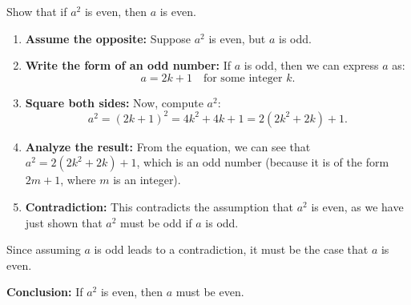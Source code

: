     \begin{example}
            Show that if \( a^2 \) is even, then \( a \) is even.

        \begin{enumerate}
            \item \textbf{Assume the opposite:} 
            Suppose \( a^2 \) is even, but \( a \) is odd.
            
            \item \textbf{Write the form of an odd number:} 
            If \( a \) is odd, then we can express \( a \) as:
            \[
            a = 2k + 1 \quad \text{for some integer } k.
            \]
            
            \item \textbf{Square both sides:} 
            Now, compute \( a^2 \):
            \[
            a^2 = (2k + 1)^2 = 4k^2 + 4k + 1 = 2(2k^2 + 2k) + 1.
            \]
            
            \item \textbf{Analyze the result:} 
            From the equation, we can see that \( a^2 = 2(2k^2 + 2k) + 1 \), which is an odd number (because it is of the form \( 2m + 1 \), where \( m \) is an integer).

            \item \textbf{Contradiction:} 
            This contradicts the assumption that \( a^2 \) is even, as we have just shown that \( a^2 \) must be odd if \( a \) is odd.

        \end{enumerate}

        Since assuming \( a \) is odd leads to a contradiction, it must be the case that \( a \) is even. 

        \textbf{Conclusion:} If \( a^2 \) is even, then \( a \) must be even.
    \end{example}

